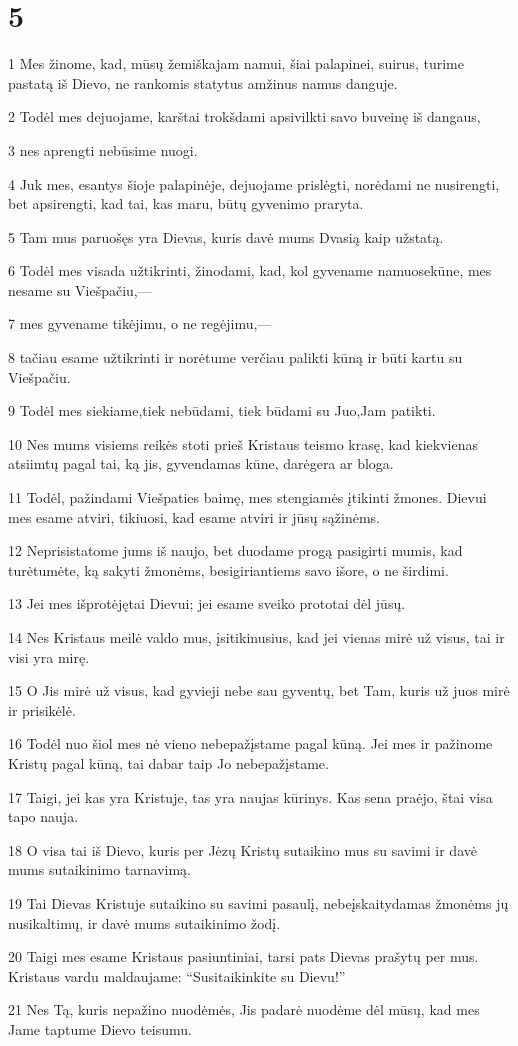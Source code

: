 \chapter{5}


\par 1 Mes žinome, kad, mūsų žemiškajam namui, šiai palapinei, suirus, turime pastatą iš Dievo, ne rankomis statytus amžinus namus danguje. 
\par 2 Todėl mes dejuojame, karštai trokšdami apsivilkti savo buveinę iš dangaus, 
\par 3 nes aprengti nebūsime nuogi. 
\par 4 Juk mes, esantys šioje palapinėje, dejuojame prislėgti, norėdami ne nusirengti, bet apsirengti, kad tai, kas maru, būtų gyvenimo praryta. 
\par 5 Tam mus paruošęs yra Dievas, kuris davė mums Dvasią kaip užstatą. 
\par 6 Todėl mes visada užtikrinti, žinodami, kad, kol gyvename namuose­kūne, mes nesame su Viešpačiu,— 
\par 7 mes gyvename tikėjimu, o ne regėjimu,— 
\par 8 tačiau esame užtikrinti ir norėtume verčiau palikti kūną ir būti kartu su Viešpačiu. 
\par 9 Todėl mes siekiame,­tiek nebūdami, tiek būdami su Juo,­Jam patikti. 
\par 10 Nes mums visiems reikės stoti prieš Kristaus teismo krasę, kad kiekvienas atsiimtų pagal tai, ką jis, gyvendamas kūne, darė­gera ar bloga. 
\par 11 Todėl, pažindami Viešpaties baimę, mes stengiamės įtikinti žmones. Dievui mes esame atviri, tikiuosi, kad esame atviri ir jūsų sąžinėms. 
\par 12 Neprisistatome jums iš naujo, bet duodame progą pasigirti mumis, kad turėtumėte, ką sakyti žmonėms, besigiriantiems savo išore, o ne širdimi. 
\par 13 Jei mes išprotėję­tai Dievui; jei esame sveiko proto­tai dėl jūsų. 
\par 14 Nes Kristaus meilė valdo mus, įsitikinusius, kad jei vienas mirė už visus, tai ir visi yra mirę. 
\par 15 O Jis mirė už visus, kad gyvieji nebe sau gyventų, bet Tam, kuris už juos mirė ir prisikėlė. 
\par 16 Todėl nuo šiol mes nė vieno nebepažįstame pagal kūną. Jei mes ir pažinome Kristų pagal kūną, tai dabar taip Jo nebepažįstame. 
\par 17 Taigi, jei kas yra Kristuje, tas yra naujas kūrinys. Kas sena­ praėjo, štai visa tapo nauja. 
\par 18 O visa tai iš Dievo, kuris per Jėzų Kristų sutaikino mus su savimi ir davė mums sutaikinimo tarnavimą. 
\par 19 Tai Dievas Kristuje sutaikino su savimi pasaulį, nebeįskaitydamas žmonėms jų nusikaltimų, ir davė mums sutaikinimo žodį. 
\par 20 Taigi mes esame Kristaus pasiuntiniai, tarsi pats Dievas prašytų per mus. Kristaus vardu maldaujame: “Susitaikinkite su Dievu!” 
\par 21 Nes Tą, kuris nepažino nuodėmės, Jis padarė nuodėme dėl mūsų, kad mes Jame taptume Dievo teisumu.


